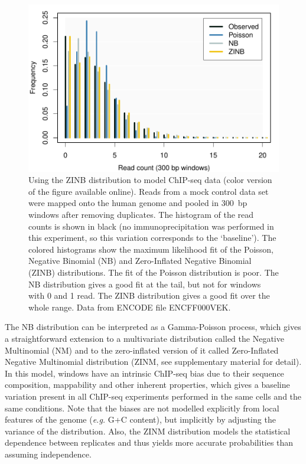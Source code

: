 \documentclass{bioinfo}
\begin{document}
\begin{methods}
\begin{figure}[!tpb]
\centerline{\includegraphics[scale=0.55]{ZINB_fit.pdf}}
\caption{
  Using the ZINB distribution to model ChIP-seq data (color
  version of the figure available online). Reads from
  a mock control data set were mapped onto the human genome and
  pooled in 300~bp windows after removing duplicates. The histogram of
  the read counts is shown in black (no immunoprecipitation was
  performed in this experiment, so this variation corresponds to the
  `baseline'). The colored histograms show the maximum
  likelihood fit of the Poisson, Negative Binomial (NB) and
  Zero-Inflated Negative Binomial (ZINB) distributions. The fit of
  the Poisson distribution is poor. The NB distribution
  gives a good fit at the tail, but not for windows with
  0 and 1 read. The ZINB distribution gives a good fit
  over the whole range. Data from ENCODE file ENCFF000VEK.
}\label{fig:ZINB_fit}
\end{figure}

The NB distribution can be interpreted as a Gamma-Poisson process,
which gives a straightforward extension to a multivariate
distribution called the Negative Multinomial (NM) and to the
zero-inflated version of it called Zero-Inflated Negative Multinomial
distribution (ZINM, see supplementary material for detail). In this
model, windows have an intrinsic ChIP-seq bias due to their sequence
composition, mappability and other inherent properties, which gives
a baseline variation present in all ChIP-seq experiments performed
in the same cells and the same conditions. Note that the biases are
not modelled explicitly from local features of the genome (\textit{e.g.}
G+C content), but implicitly by adjusting the variance of the
distribution. Also, the ZINM distribution models the statistical
dependence between replicates and thus yields more accurate
probabilities than assuming independence.


\end{methods}
\end{document}
